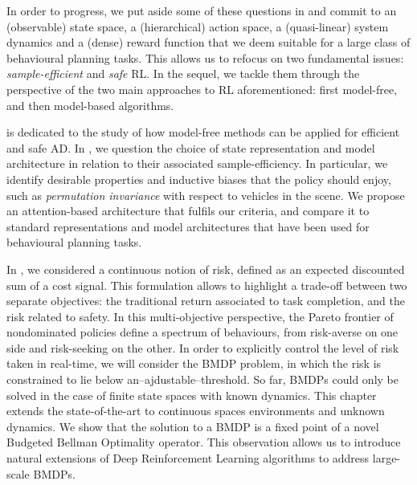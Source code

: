 In order to progress, we put aside some of these questions in  and commit to an (observable) state space, a (hierarchical) action space, a (quasi-linear) system dynamics and a (dense) reward function that we deem suitable for a large class of behavioural planning tasks. This allows us to refocus on two fundamental issues: \textit{sample-efficient} and \textit{safe} \acl*{RL}. In the sequel, we tackle them through the perspective of the two main approaches to \acl*{RL} aforementioned: first model-free, and then model-based algorithms.

 is dedicated to the study of how model-free methods can be applied for efficient and safe \acl*{AD}. In , we question the choice of state representation and model architecture in relation to their associated sample-efficiency. In particular, we identify desirable properties and inductive biases that the policy should enjoy, such as \emph{permutation invariance} with respect to vehicles in the scene. We propose an attention-based architecture that fulfils our criteria, and compare it to standard representations and model architectures that have been used for behavioural planning tasks. 

In , we considered a continuous notion of risk, defined as an expected discounted sum of a cost signal. This formulation allows to highlight a trade-off between two separate objectives: the traditional return associated to task completion, and the risk related to safety. In this multi-objective perspective, the Pareto frontier of nondominated policies define a spectrum of behaviours, from risk-averse on one side and risk-seeking on the other. In order to explicitly control the level of risk taken in real-time, we will consider the \ac{BMDP} problem, in which the risk is constrained to lie below an--ajdustable--threshold. 
So far, \acp*{BMDP} could only be solved in the case of finite state spaces with known dynamics. This chapter extends the state-of-the-art to continuous spaces environments and unknown dynamics. We show that the solution to a \ac*{BMDP} is a fixed point of a novel Budgeted Bellman Optimality operator. This observation allows us to introduce natural extensions of Deep Reinforcement Learning algorithms to address large-scale \acp*{BMDP}.

